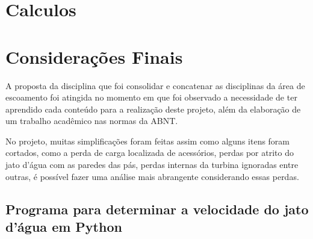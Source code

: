 \documentclass[a4paper, 12pt, openany, oneside, brazil]{abntex2} %
\begin{document}


\chapter{Calculos}

\chapter{Considerações Finais}

    A proposta da disciplina que foi consolidar e concatenar as disciplinas da área de escoamento foi atingida no momento em que foi observado a necessidade de ter aprendido cada conteúdo para a realização deste projeto, além da elaboração de um trabalho acadêmico nas normas da ABNT.

    No projeto, muitas simplificações foram feitas assim como alguns itens foram cortados, como a perda de carga localizada de acessórios, perdas por atrito do jato d'água com as paredes das pás, perdas internas da turbina ignoradas entre outras, é possível fazer uma análise mais abrangente considerando essas perdas.

% 



\begin{apendicesenv}


\chapter{Programa para determinar a velocidade do jato d'água em Python}
\label{ap-python}
 


\end{apendicesenv}
\end{document}
